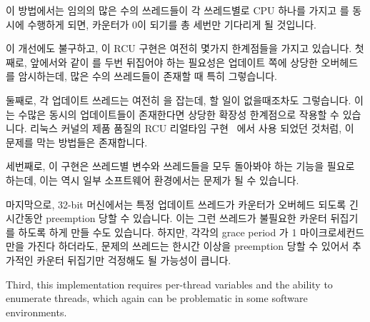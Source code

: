 이 방법에서는 임의의 많은 수의 쓰레드들이 각 쓰레드별로 CPU 하나를 가지고
 를 동시에 수행하게 되면, 카운터가 0이 되기를 총 세번만
기다리게 될 것입니다.

이 개선에도 불구하고, 이 RCU 구현은 여전히 몇가지 한계점들을 가지고 있습니다.
첫째로, 앞에서와 같이  를 두번 뒤집어야 하는 필요성은 업데이트 쪽에
상당한 오버헤드를 암시하는데, 많은 수의 쓰레드들이 존재할 때 특히 그렇습니다.

둘째로, 각 업데이트 쓰레드는 여전히  을 잡는데, 할 일이
없을때조차도 그렇습니다.
이는 수많은 동시의 업데이트들이 존재한다면 상당한 확장성 한계점으로 작용할 수
있습니다.
리눅스 커널의 제품 품질의 RCU 리얼타임
구현~\cite{PaulEMcKenney2007PreemptibleRCU} 에서 사용 되었던 것처럼, 이 문제를
막는 방법들은 존재합니다.
\iffalse

With this approach, if an arbitrarily large number of threads invoke
\co{synchronize_rcu()} concurrently, with one CPU for each thread, there
will be a total of only three waits for counters to go to zero.

Despite the improvements, this implementation of RCU still
has a few shortcomings.
First, as before, the need to flip \co{rcu_idx} twice imposes substantial
overhead on updates, especially if there are large
numbers of threads.

Second, each updater still acquires \co{rcu_gp_lock}, even if there
is no work to be done.
This can result in a severe scalability limitation
if there are large numbers of concurrent updates.
There are ways of avoiding this, as was done in a
production-quality real-time implementation of RCU for the Linux
kernel~\cite{PaulEMcKenney2007PreemptibleRCU}.
\fi

세번째로, 이 구현은 쓰레드별 변수와 쓰레드들을 모두 돌아봐야 하는 기능을 필요로
하는데, 이는 역시 일부 소프트웨어 환경에서는 문제가 될 수 있습니다.

마지막으로, 32-bit 머신에서는 특정 업데이트 쓰레드가  카운터가
오버헤드 되도록 긴 시간동안 preemption 당할 수 있습니다.
이는 그런 쓰레드가 불필요한 카운터 뒤집기를 하도록 하게 만들 수도 있습니다.
하지만, 각각의 grace period 가 1 마이크로세컨드 만을 가진다 하더라도, 문제의
쓰레드는 한시간 이상을 preemption 당할 수 있어서 추가적인 카운터 뒤집기만
걱정해도 될 가능성이 큽니다.
\iffalse

Third, this implementation requires per-thread variables
and the ability to enumerate threads, which again can be
problematic in some software environments.

